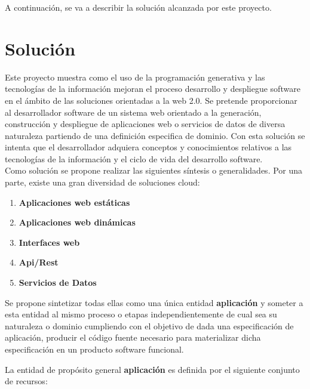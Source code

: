 \documentclass[a4paper,11pt]{book}
\begin{document}
A continuación, se va a describir la solución alcanzada por este proyecto. 

\section{Solución}

Este proyecto muestra como el uso de la programación generativa y las tecnologías de la información mejoran el proceso desarrollo y despliegue software en el ámbito de las soluciones orientadas a la web 2.0. Se pretende proporcionar al desarrollador software de un sistema web orientado a la generación, construcción y despliegue de aplicaciones web o servicios de datos de diversa naturaleza partiendo de una definición especifica de dominio. Con esta solución se intenta que el desarrollador adquiera conceptos y conocimientos relativos a las tecnologías de la información y el ciclo de vida del desarrollo software.  \\

Como solución se propone realizar las siguientes síntesis o generalidades.  Por una parte, existe una gran diversidad de soluciones cloud: 

\begin{enumerate}
\item \textbf{ Aplicaciones web estáticas }
\item \textbf{ Aplicaciones web dinámicas}
\item \textbf{ Interfaces web }
\item \textbf{ Api/Rest }
\item \textbf{ Servicios de Datos }
\end{enumerate}

Se propone sintetizar todas ellas  como una única  entidad \textbf{aplicación} y  someter a esta entidad al mismo proceso o etapas independientemente de cual sea su naturaleza o dominio cumpliendo con el objetivo de dada una especificación de aplicación, producir el código fuente necesario para materializar dicha especificación en un producto software funcional. 



La entidad de propósito general \textbf{aplicación} es definida por el siguiente conjunto de recursos:    
\end{document}
